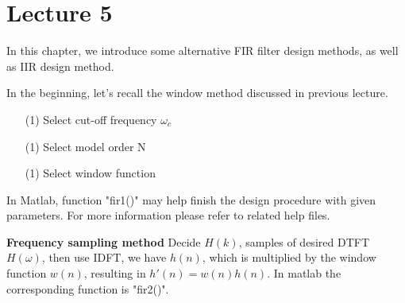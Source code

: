 \chapter*{Lecture 5}
In this chapter, we introduce some alternative FIR filter design methods,
as well as IIR design method. 

In the beginning, let's recall the window method discussed in previous lecture.
\begin{itemize}
\item[(1)] Select cut-off frequency $\omega_c$
\item[(1)] Select model order N
\item[(1)] Select window function
\end{itemize}
In Matlab, function "fir1()" may help finish the design procedure with given 
parameters. For more information please refer to related help files.

\textbf{Frequency sampling method}
Decide $H(k)$, samples of desired DTFT $H(\omega)$, then use IDFT,
we have $h(n)$, which is multiplied by the window function $w(n)$,
resulting in $h'(n)=w(n)h(n)$. In matlab the corresponding function 
is "fir2()".


